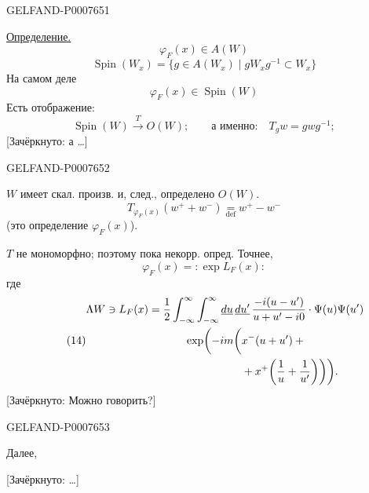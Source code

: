 \begin{GelfandAdjacentEvidence}{GELFAND-P000765}{1}

\underline{Определение.}
\[
\varphi_F(x)\in A(W)
\]
\[
\operatorname{Spin}(W_x)=\{g\in A(W_x)\mid gW_xg^{-1}\subset W_x\}
\]
На самом деле
\[
\varphi_F(x)\in\operatorname{Spin}(W)
\]
Есть отображение:
\begin{equation*}
\tag{11}
\operatorname{Spin}(W)\overset{T}{\longrightarrow}O(W);
\qquad\text{а именно:}\quad T_gw=gwg^{-1};
\end{equation*}
[Зачёркнуто: а …]
\end{GelfandAdjacentEvidence}
\begin{GelfandAdjacentEvidence}{GELFAND-P000765}{2}


\(W\) имеет скал. произв. и, след., определено \(O(W)\).
\begin{equation*}
\tag{12}
T_{\varphi_F(x)}(w^++w^-)\underset{\mathrm{def}}{=}w^+-w^-
\end{equation*}
(это определение \(\varphi_F(x)\)).

\(T\) не мономорфно; поэтому пока некорр. опред. Точнее,
\begin{equation*}
\tag{13}
\varphi_F(x)={:}\exp L_F(x){:}
\end{equation*}
где
\begin{equation*}
\tag{14}
\begin{aligned}
\Lambda W\ni L_F(x)={}&
\frac12\int_{-\infty}^{\infty}\int_{-\infty}^{\infty}
\underline{du}\,\underline{du'}\,\frac{-i(u-u')}{u+u'-i0}\cdot
\Psi(u)\Psi(u')\\
&{}\qquad\exp\biggl(-im\biggl(x^-(u+u')+{}\\
&\hphantom{{}\qquad\exp\biggl(-im\biggl(}{}+
x^+\biggl(\frac1u+\frac1{u'}\biggr)\biggr)\biggr).
\end{aligned}
\end{equation*}
[Зачёркнуто: Можно говорить?]
\end{GelfandAdjacentEvidence}
\begin{GelfandAdjacentEvidence}{GELFAND-P000765}{3}


Далее,

[Зачёркнуто: …]
\end{GelfandAdjacentEvidence}
